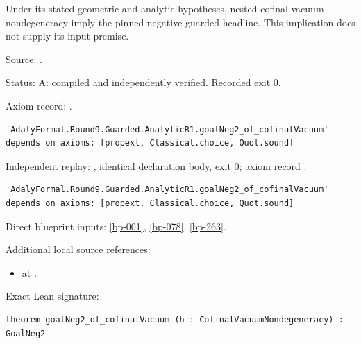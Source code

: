 \begin{theorem}[bp-264]
\label{bp-264}
\leanok
Under its stated geometric and analytic hypotheses, nested cofinal vacuum nondegeneracy imply the pinned negative guarded headline. This implication does not supply its input premise.

\par Source: \texttt{}.
\par Status: A: compiled and independently verified. Recorded exit 0.
\par Axiom record: \texttt{}.
\begin{verbatim}
'AdalyFormal.Round9.Guarded.AnalyticR1.goalNeg2_of_cofinalVacuum' depends on axioms: [propext, Classical.choice, Quot.sound]
\end{verbatim}
\par Independent replay: \texttt{}, identical declaration body, exit 0; axiom record \texttt{}.
\begin{verbatim}
'AdalyFormal.Round9.Guarded.AnalyticR1.goalNeg2_of_cofinalVacuum' depends on axioms: [propext, Classical.choice, Quot.sound]
\end{verbatim}
\par Direct blueprint inputs: \ref{bp-001}, \ref{bp-078}, \ref{bp-263}.
\par Additional local source references:
\begin{itemize}
\item \texttt{} at \texttt{}.
\end{itemize}
\par Exact Lean signature:
\begin{verbatim}
theorem goalNeg2_of_cofinalVacuum (h : CofinalVacuumNondegeneracy) : GoalNeg2
\end{verbatim}
\end{theorem}

